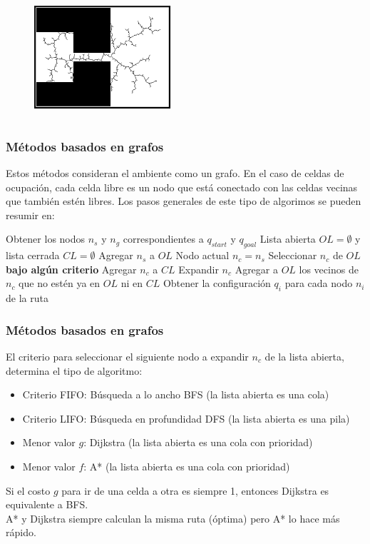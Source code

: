 \begin{frame}
\begin{columns}
\begin{column}{0.45\textwidth}
\begin{figure}
        \includegraphics[width=0.45\textwidth]{Figures/MotionPlanning/RRTO0300.png}
      \end{figure}
    \end{column}
  \end{columns}
\end{frame}

\begin{frame}\frametitle{Métodos basados en grafos}
  Estos métodos consideran el ambiente como un grafo. En el caso de celdas de ocupación, cada celda libre es un nodo que está conectado con las celdas vecinas que también estén libres. Los pasos generales de este tipo de algorimos se pueden resumir en:
  \[\]
  \begin{algorithm}[H]
    \footnotesize
    \DontPrintSemicolon
    Obtener los nodos $n_s$ y $n_g$ correspondientes a $q_{start}$ y $q_{goal}$\;
    Lista abierta $OL = \emptyset$ y lista cerrada $CL = \emptyset$\;
    Agregar $n_s$ a $OL$\;
    Nodo actual $n_c = n_s$\;
    {
      Seleccionar $n_c$ de $OL$ \textbf{bajo algún criterio}\;
      Agregar $n_c$ a $CL$\;
      Expandir $n_c$\;
      Agregar a $OL$ los vecinos de $n_c$ que no estén ya en $OL$ ni en $CL$\;
    }
    Obtener la configuración $q_i$ para cada nodo $n_i$ de la ruta\;
  \end{algorithm}
\end{frame}

\begin{frame}\frametitle{Métodos basados en grafos}
  El criterio para seleccionar el siguiente nodo a expandir $n_c$ de la lista abierta, determina el tipo de algoritmo:
  \begin{itemize}
  \item Criterio FIFO: Búsqueda a lo ancho BFS (la lista abierta es una cola)
  \item Criterio LIFO:  Búsqueda en profundidad DFS (la lista abierta es una pila)
  \item Menor valor $g$: Dijkstra (la lista abierta es una cola con prioridad)
  \item Menor valor $f$: A* (la lista abierta es una cola con prioridad)
  \end{itemize}
  Si el costo $g$ para ir de una celda a otra es siempre 1, entonces Dijkstra es equivalente a BFS. \\
  A* y Dijkstra siempre calculan la misma ruta (óptima) pero A* lo hace más rápido. 
\end{frame}

